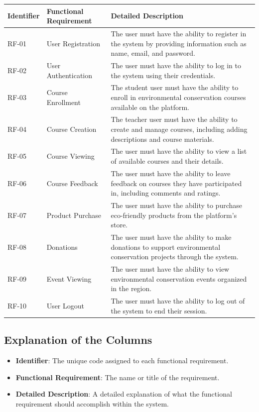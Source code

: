 \begin{longtable}{|>{\raggedright}m{2cm}|>{\raggedright}m{4cm}|>{\raggedright\arraybackslash}m{8cm}|}
\hline
\textbf{Identifier} & \textbf{Functional Requirement} & \textbf{Detailed Description} \\
\hline
RF-01 & User Registration & The user must have the ability to register in the system by providing information such as name, email, and password. \\
\hline
RF-02 & User Authentication & The user must have the ability to log in to the system using their credentials. \\
\hline
RF-03 & Course Enrollment & The student user must have the ability to enroll in environmental conservation courses available on the platform. \\
\hline
RF-04 & Course Creation & The teacher user must have the ability to create and manage courses, including adding descriptions and course materials. \\
\hline
RF-05 & Course Viewing & The user must have the ability to view a list of available courses and their details. \\
\hline
RF-06 & Course Feedback & The user must have the ability to leave feedback on courses they have participated in, including comments and ratings. \\
\hline
RF-07 & Product Purchase & The user must have the ability to purchase eco-friendly products from the platform's store. \\
\hline
RF-08 & Donations & The user must have the ability to make donations to support environmental conservation projects through the system. \\
\hline
RF-09 & Event Viewing & The user must have the ability to view environmental conservation events organized in the region. \\
\hline
RF-10 & User Logout & The user must have the ability to log out of the system to end their session. \\
\hline
\end{longtable}

\subsection*{Explanation of the Columns}

\begin{itemize}
    \item \textbf{Identifier}: The unique code assigned to each functional requirement.
    \item \textbf{Functional Requirement}: The name or title of the requirement.
    \item \textbf{Detailed Description}: A detailed explanation of what the functional requirement should accomplish within the system.
\end{itemize}

